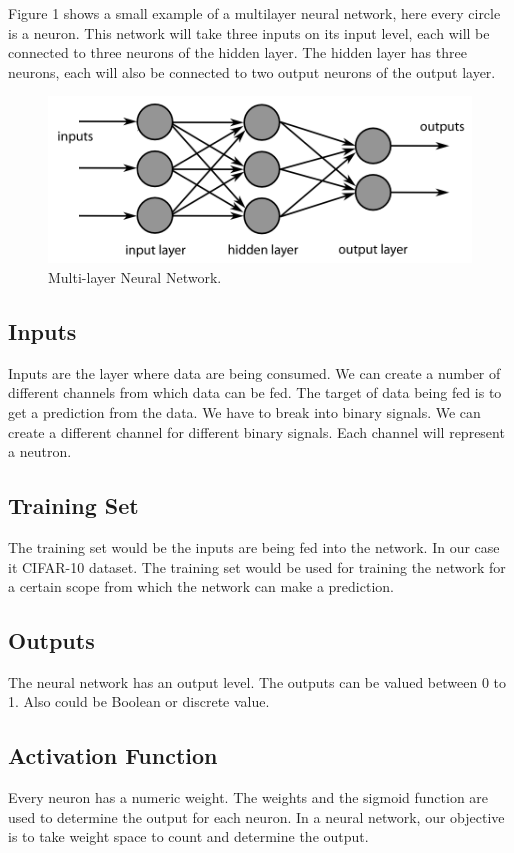 \documentclass[12pt]{article}
\begin{document}
 Figure 1 shows a small example of a multilayer neural network, here every circle is a neuron. This network will take three inputs on its input level, each will be connected to three neurons of the hidden layer. The hidden layer has three neurons, each will also be connected to two output neurons of the output layer.


\begin{figure}
	\includegraphics[width=\linewidth]{images/multi-layer.png}
	\caption{Multi-layer Neural Network.}
	\label{fig:multi-layer}
\end{figure}

\subsection{Inputs}
Inputs are the layer where data are being consumed. We can create a number of different channels from which data can be fed. The target of data being fed is to get a prediction from the data. We have to break into binary signals. We can create a different channel for different binary signals. Each channel will represent a neutron.

\subsection{Training Set}
The training set would be the inputs are being fed into the network. In our case it CIFAR-10 dataset. The training set would be used for training the network for a certain scope from which the network can make a prediction.

\subsection{Outputs}
The neural network has an output level. The outputs can be valued between 0 to 1. Also could be Boolean or discrete value.

\subsection{Activation Function}
Every neuron has a numeric weight. The weights and the sigmoid function are used to determine the output for each neuron. In a neural network, our objective is to take weight space to count and determine the output.
\end{document}
